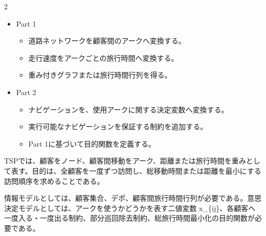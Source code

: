 \clearpage
{}
\begin{multicols}{2}\footnotesize\raggedcolumns
{}
\begin{itemize}
\item Part 1
\begin{itemize}
\item 道路ネットワークを顧客間のアークへ変換する。
\item 走行速度をアークごとの旅行時間へ変換する。
\item 重み付きグラフまたは旅行時間行列を得る。
\end{itemize}
\item Part 2
\begin{itemize}
\item ナビゲーションを、使用アークに関する決定変数へ変換する。
\item 実行可能なナビゲーションを保証する制約を追加する。
\item Part 1に基づいて目的関数を定義する。
\end{itemize}
\end{itemize}
TSPでは、顧客をノード、顧客間移動をアーク、距離または旅行時間を重みとして表す。目的は、全顧客を一度ずつ訪問し、総移動時間または距離を最小にする訪問順序を求めることである。\par

情報モデルとしては、顧客集合、デポ、顧客間旅行時間行列が必要である。意思決定モデルとしては、アークを使うかどうかを表す二値変数 x\_\{ij\}、各顧客へ一度入る・一度出る制約、部分巡回除去制約、総旅行時間最小化の目的関数が必要である。\par


\end{multicols}
